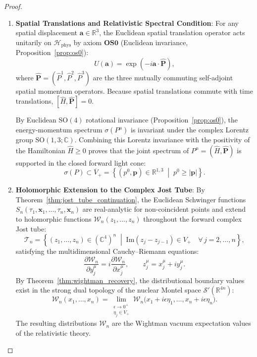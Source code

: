 \begin{proof}
\begin{enumerate}[label=\textbf{Step \arabic*:}, leftmargin=*]
    \item \textbf{Spatial Translations and Relativistic Spectral Condition}:
    For any spatial displacement $\mathbf{a} \in \mathbb{R}^3$, the Euclidean spatial translation operator acts unitarily on $\mathcal{H}_{\mathrm{phys}}$ by axiom $\mathbf{OS0}$ (Euclidean invariance, Proposition~\ref{prop:os0}):
    \begin{equation}
    U(\mathbf{a}) = \exp(-i \mathbf{a} \cdot \hat{\mathbf{P}}),
    \end{equation}
    where $\hat{\mathbf{P}} = (\hat{P}^1, \hat{P}^2, \hat{P}^3)$ are the three mutually commuting self-adjoint spatial momentum operators. Because spatial translations commute with time translations, $[\hat{H}, \hat{\mathbf{P}}] = 0$.
    
    By Euclidean $\mathrm{SO}(4)$ rotational invariance (Proposition~\ref{prop:os0}), the energy-momentum spectrum $\sigma(P^\mu)$ is invariant under the complex Lorentz group $\mathrm{SO}(1, 3; \mathbb{C})$. Combining this Lorentz invariance with the positivity of the Hamiltonian $\hat{H} \ge 0$ proves that the joint spectrum of $P^\mu = (\hat{H}, \hat{\mathbf{P}})$ is supported in the closed forward light cone:
    \begin{equation}
    \sigma(P) \subset \overline{V}_+ = \left\{ (p^0, \mathbf{p}) \in \mathbb{R}^{1,3} \;\middle|\; p^0 \ge |\mathbf{p}| \right\}.
    \end{equation}

    \item \textbf{Holomorphic Extension to the Complex Jost Tube}:
    By Theorem~\ref{thm:jost_tube_continuation}, the Euclidean Schwinger functions $S_n(\tau_1, \mathbf{x}_1, \dots, \tau_n, \mathbf{x}_n)$ are real-analytic for non-coincident points and extend to holomorphic functions $\mathcal{W}_n(z_1, \dots, z_n)$ throughout the forward complex Jost tube:
    \begin{equation}
    \mathcal{T}_n = \left\{ (z_1, \dots, z_n) \in (\mathbb{C}^4)^n \;\middle|\; \mathrm{Im}(z_j - z_{j-1}) \in V_+ \quad \forall \, j = 2, \dots, n \right\},
    \end{equation}
    satisfying the multidimensional Cauchy--Riemann equations:
    \begin{equation}
    \frac{\partial \mathcal{W}_n}{\partial y_j^\mu} = i \frac{\partial \mathcal{W}_n}{\partial x_j^\mu}, \qquad z_j^\mu = x_j^\mu + i y_j^\mu.
    \end{equation}
    By Theorem~\ref{thm:wightman_recovery}, the distributional boundary values exist in the strong dual topology of the nuclear Montel space $\mathcal{S}'(\mathbb{R}^{4n})$:
    \begin{equation}
    \mathcal{W}_n(x_1, \dots, x_n) = \lim_{\substack{\epsilon \to 0^+ \\ \eta_j \in V_+}} \mathcal{W}_n\bigl( x_1 + i \epsilon \eta_1, \dots, x_n + i \epsilon \eta_n \bigr).
    \end{equation}
    The resulting distributions $\mathcal{W}_n$ are the Wightman vacuum expectation values of the relativistic theory.


\end{enumerate}
\end{proof}
